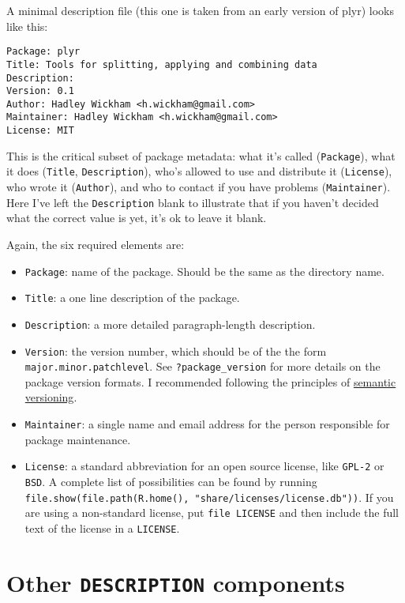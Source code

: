 A minimal description file (this one is taken from an early version of
plyr) looks like this:

\begin{verbatim}
Package: plyr
Title: Tools for splitting, applying and combining data
Description: 
Version: 0.1
Author: Hadley Wickham <h.wickham@gmail.com>
Maintainer: Hadley Wickham <h.wickham@gmail.com>
License: MIT
\end{verbatim}

This is the critical subset of package metadata: what it's called
(\texttt{Package}), what it does (\texttt{Title}, \texttt{Description}),
who's allowed to use and distribute it (\texttt{License}), who wrote it
(\texttt{Author}), and who to contact if you have problems
(\texttt{Maintainer}). Here I've left the \texttt{Description} blank to
illustrate that if you haven't decided what the correct value is yet,
it's ok to leave it blank.

Again, the six required elements are:

\begin{itemize}
\item
  \texttt{Package}: name of the package. Should be the same as the
  directory name.
\item
  \texttt{Title}: a one line description of the package.
\item
  \texttt{Description}: a more detailed paragraph-length description.
\item
  \texttt{Version}: the version number, which should be of the the form
  \texttt{major.minor.patchlevel}. See \texttt{?package\_version} for
  more details on the package version formats. I recommended following
  the principles of \href{http://semver.org/}{semantic versioning}.
\item
  \texttt{Maintainer}: a single name and email address for the person
  responsible for package maintenance.
\item
  \texttt{License}: a standard abbreviation for an open source license,
  like \texttt{GPL-2} or \texttt{BSD}. A complete list of possibilities
  can be found by running
  \texttt{file.show(file.path(R.home(), "share/licenses/license.db"))}.
  If you are using a non-standard license, put \texttt{file LICENSE} and
  then include the full text of the license in a \texttt{LICENSE}.
\end{itemize}

\section{Other \texttt{DESCRIPTION} components}

